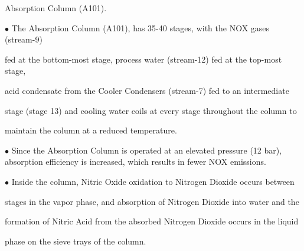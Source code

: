 \documentclass[a4paper,portrait,12pt]{article}
\begin{document}
\begin{flushleft}
Absorption Column (A101).
\end{flushleft}


\begin{flushleft}
$\bullet$ The Absorption Column (A101), has 35-40 stages, with the NOX gases (stream-9)
\end{flushleft}


\begin{flushleft}
fed at the bottom-most stage, process water (stream-12) fed at the top-most stage,
\end{flushleft}


\begin{flushleft}
acid condensate from the Cooler Condensers (stream-7) fed to an intermediate
\end{flushleft}


\begin{flushleft}
stage (stage 13) and cooling water coils at every stage throughout the column to
\end{flushleft}


\begin{flushleft}
maintain the column at a reduced temperature.
\end{flushleft}


\begin{flushleft}
$\bullet$ Since the Absorption Column is operated at an elevated pressure (12 bar), absorption efficiency is increased, which results in fewer NOX emissions.
\end{flushleft}


\begin{flushleft}
$\bullet$ Inside the column, Nitric Oxide oxidation to Nitrogen Dioxide occurs between
\end{flushleft}


\begin{flushleft}
stages in the vapor phase, and absorption of Nitrogen Dioxide into water and the
\end{flushleft}


\begin{flushleft}
formation of Nitric Acid from the absorbed Nitrogen Dioxide occurs in the liquid
\end{flushleft}


\begin{flushleft}
phase on the sieve trays of the column.
\end{flushleft}
\end{document}
